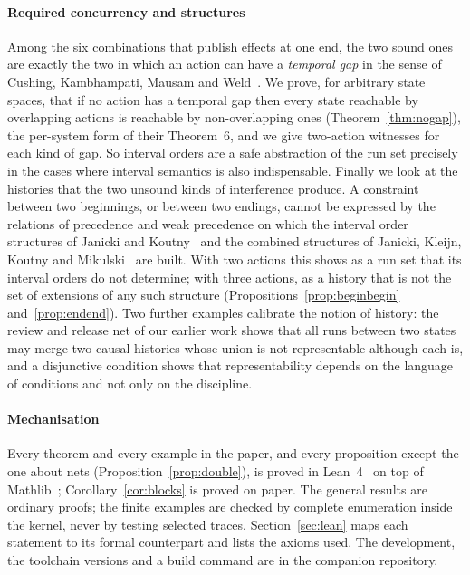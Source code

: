 \documentclass[preprint,12pt]{elsarticle}
\theoremstyle{plain}
\theoremstyle{definition}
\begin{document}
\paragraph{Required concurrency and structures}
Among the six combinations that publish effects at one end, the two sound ones are exactly the two in which an action can have a \emph{temporal gap} in the sense of Cushing, Kambhampati, Mausam and Weld~\cite{CushingEtAl2007}. We prove, for arbitrary state spaces, that if no action has a temporal gap then every state reachable by overlapping actions is reachable by non-overlapping ones (Theorem~\ref{thm:nogap}), the per-system form of their Theorem~6, and we give two-action witnesses for each kind of gap. So interval orders are a safe abstraction of the run set precisely in the cases where interval semantics is also indispensable. Finally we look at the histories that the two unsound kinds of interference produce. A constraint between two beginnings, or between two endings, cannot be expressed by the relations of precedence and weak precedence on which the interval order structures of Janicki and Koutny~\cite{JanickiKoutny1993} and the combined structures of Janicki, Kleijn, Koutny and Mikulski~\cite{JanickiKleijnKoutnyMikulski2024} are built. With two actions this shows as a run set that its interval orders do not determine; with three actions, as a history that is not the set of extensions of any such structure (Propositions~\ref{prop:beginbegin} and~\ref{prop:endend}). Two further examples calibrate the notion of history: the review and release net of our earlier work shows that all runs between two states may merge two causal histories whose union is not representable although each is, and a disjunctive condition shows that representability depends on the language of conditions and not only on the discipline.

\paragraph{Mechanisation}
Every theorem and every example in the paper, and every proposition except the one about nets (Proposition~\ref{prop:double}), is proved in Lean~4~\cite{deMouraUllrich2021} on top of Mathlib~\cite{Mathlib2020}; Corollary~\ref{cor:blocks} is proved on paper. The general results are ordinary proofs; the finite examples are checked by complete enumeration inside the kernel, never by testing selected traces. Section~\ref{sec:lean} maps each statement to its formal counterpart and lists the axioms used. The development, the toolchain versions and a build command are in the companion repository.
\end{document}
